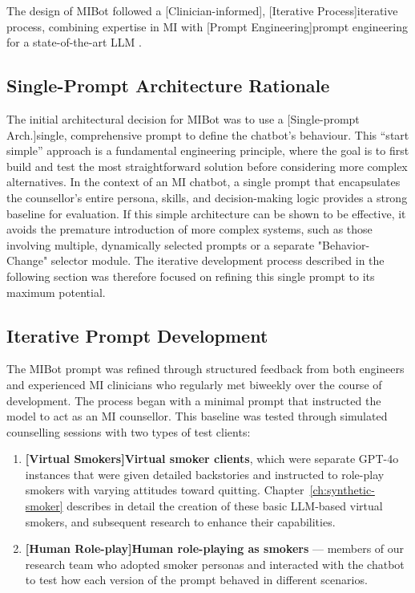 The design of MIBot followed a [Clinician-informed], [Iterative Process]iterative process, combining expertise in MI with [Prompt Engineering]prompt engineering for a state-of-the-art LLM \cite{openai2024gpt4ocard}.

\subsection{Single-Prompt Architecture Rationale}
\label{sec:single-prompt-rationale}

The initial architectural decision for MIBot was to use a [Single-prompt Arch.]single, comprehensive prompt to define the chatbot's behaviour. This ``start simple'' approach is a fundamental engineering principle, where the goal is to first build and test the most straightforward solution before considering more complex alternatives. In the context of an MI chatbot, a single prompt that encapsulates the counsellor's entire persona, skills, and decision-making logic provides a strong baseline for evaluation. If this simple architecture can be shown to be effective, it avoids the premature introduction of more complex systems, such as those involving multiple, dynamically selected prompts or a separate "Behavior-Change" selector module. The iterative development process described in the following section was therefore focused on refining this single prompt to its maximum potential.

\subsection{Iterative Prompt Development}
The MIBot prompt was refined through structured feedback from both engineers and experienced MI clinicians who regularly met biweekly over the course of development. The process began with a minimal prompt that instructed the model to act as an MI counsellor. This baseline was tested through simulated counselling sessions with two types of test clients:

\begin{enumerate}
    \item \textbf{[Virtual Smokers]Virtual smoker clients}, which were separate GPT-4o instances that were given detailed backstories and instructed to role-play smokers with varying attitudes toward quitting. Chapter~\ref{ch:synthetic-smoker} describes in detail the creation of these basic LLM-based virtual smokers, and subsequent research to enhance their capabilities.
    \item \textbf{[Human Role-play]Human role-playing as smokers} --- members of our research team who adopted smoker personas and interacted with the chatbot to test how each version of the prompt behaved in different scenarios.
\end{enumerate}

